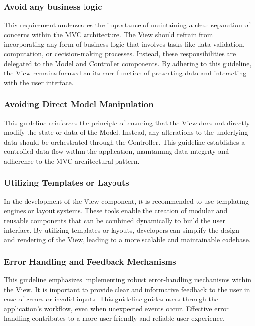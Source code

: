 \subsubsection{Avoid any business logic}
This requirement underscores the importance of maintaining a clear separation of concerns within the MVC architecture. The View should refrain from incorporating any form of business logic that involves tasks like data validation, computation, or decision-making processes. Instead, these responsibilities are delegated to the Model and Controller components. By adhering to this guideline, the View remains focused on its core function of presenting data and interacting with the user interface.

\subsubsection{Avoiding Direct Model Manipulation}
This guideline reinforces the principle of ensuring that the View does not directly modify the state or data of the Model. Instead, any alterations to the underlying data should be orchestrated through the Controller. This guideline establishes a controlled data flow within the application, maintaining data integrity and adherence to the MVC architectural pattern.

\subsubsection{Utilizing Templates or Layouts}
In the development of the View component, it is recommended to use templating engines or layout systems. These tools enable the creation of modular and reusable components that can be combined dynamically to build the user interface. By utilizing templates or layouts, developers can simplify the design and rendering of the View, leading to a more scalable and maintainable codebase.

\subsubsection{Error Handling and Feedback Mechanisms}
This guideline emphasizes implementing robust error-handling mechanisms within the View. It is important to provide clear and informative feedback to the user in case of errors or invalid inputs. This guideline guides users through the application's workflow, even when unexpected events occur. Effective error handling contributes to a more user-friendly and reliable user experience.

